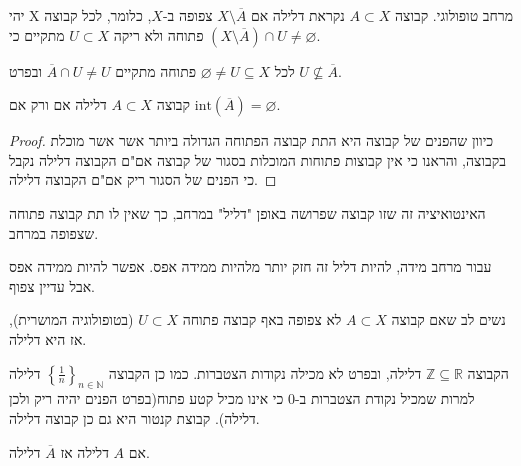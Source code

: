 \documentclass{tstextbook}
\begin{document}
\begin{definition}
יהי X מרחב טופולוגי. קבוצה \(A\subset X\) נקראת דלילה אם \(X\setminus\overline{A}\) צפופה ב-\(X\), כלומר, לכל קבוצה פתוחה ולא ריקה \(U\subset X\) מתקיים כי \(\left( X\setminus\overline{A} \right)\cap U\ne\varnothing\).

\end{definition}
\begin{corollary}
לכל \(\varnothing \neq U\subseteq X\) פתוחה מתקיים \(\overline{A}\cap U\neq U\) ובפרט \(U \not \subseteq \overline{A}\).

\end{corollary}
\begin{corollary}
קבוצה \(A\subset X\) דלילה אם ורק אם \(\text{int}\left( \overline{A} \right)=\varnothing\).

\end{corollary}
\begin{proof}
כיוון שהפנים של קבוצה היא התת קבוצה הפתוחה הגדולה ביותר אשר אשר מוכלת בקבוצה, והראנו כי אין קבוצות פתוחות המוכלות בסגור של קבוצה אם"ם הקבוצה דלילה נקבל כי הפנים של הסגור ריק אם"ם הקבוצה דלילה.

\end{proof}
\begin{remark}
האינטואיציה זה שזו קבוצה שפרושה באופן "דליל" במרחב, כך שאין לו תת קבוצה פתוחה שצפופה במרחב.

\end{remark}
\begin{remark}
עבור מרחב מידה, להיות דליל זה חזק יותר מלהיות ממידה אפס. אפשר להיות ממידה אפס אבל עדיין צפוף.

\end{remark}
\begin{remark}
נשים לב שאם קבוצה \(A\subset X\) לא צפופה באף קבוצה פתוחה \(U\subset X\) (בטופולוגיה המושרית), אז היא דלילה.

\end{remark}
\begin{example}
הקבוצה \(\mathbb{Z}\subseteq \mathbb{R}\) דלילה, ובפרט לא מכילה נקודות הצטברות. כמו כן הקבוצה \(\left\{  \frac{1}{n}  \right\}_{n \in \mathbb{N}}\) דלילה למרות שמכיל נקודת הצטברות ב-\(0\) כי אינו מכיל קטע פתוח(בפרט הפנים יהיה ריק ולכן דלילה). קבוצת קנטור היא גם כן קבוצה דלילה.

\end{example}
\begin{corollary}
אם \(A\) דלילה אז \(\overline{A}\) דלילה.

\end{corollary}
\end{document}
